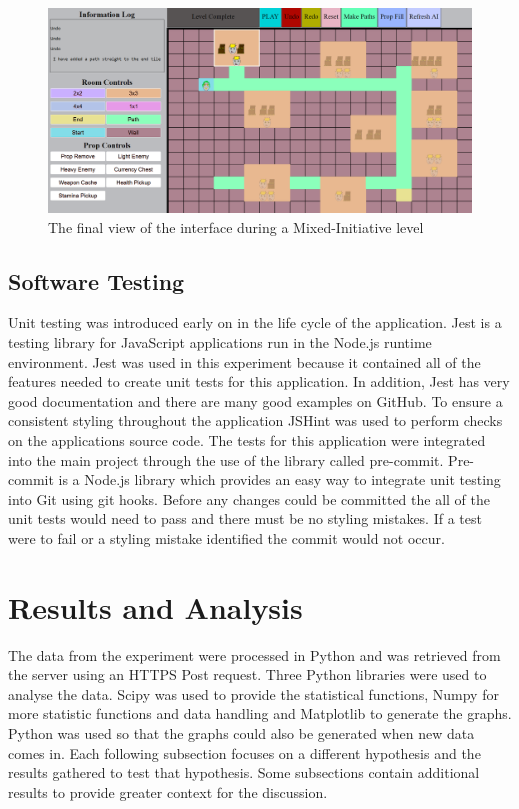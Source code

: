 \documentclass[journal]{IEEEtran}
\begin{document}
\begin{figure}[h]
	\includegraphics[width=1.0\linewidth]{LevelEditorFinal.PNG}
	\caption{The final view of the interface during a Mixed-Initiative level}
	\label{levelEditorFinal}
\end{figure} 

\subsection{Software Testing}
Unit testing was introduced early on in the life cycle of the application. Jest is a testing library for JavaScript applications run in the Node.js runtime environment. Jest was used in this experiment because it contained all of the features needed to create unit tests for this application. In addition, Jest has very good documentation and there are many good examples on GitHub.  To ensure a consistent styling throughout the application JSHint was used to perform checks on the applications source code. The tests for this application were integrated into the main project through the use of the library called pre-commit. Pre-commit is a  Node.js library which provides an easy way to integrate unit testing into Git using git hooks. Before any changes could be committed the all of the unit tests would need to pass and there must be no styling mistakes. If a test were to fail or a styling mistake identified the commit would not occur. 


\section{Results and Analysis}
The data from the experiment were processed in Python and was retrieved from the server using an HTTPS Post request. Three Python libraries were used to analyse the data. Scipy was used to provide the statistical functions, Numpy for more statistic functions and data handling and Matplotlib to generate the graphs. Python was used so that the graphs could also be generated when new data comes in. Each following subsection focuses on a different hypothesis and the results gathered to test that hypothesis. Some subsections contain additional results to provide greater context for the discussion.
\end{document}
